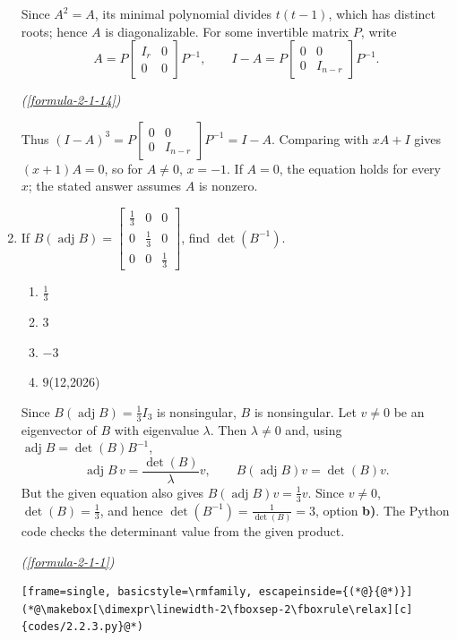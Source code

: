 \begin{enumerate}[label={},font=\normalfont,leftmargin=1.15cm,labelwidth=1.0cm,labelsep=0.15cm,itemindent=0pt,listparindent=0pt,itemsep=\baselineskip,parsep=0pt,topsep=0pt]
Since $A^2=A$, its minimal polynomial divides $t(t-1)$, which has distinct roots; hence $A$ is diagonalizable. For some invertible matrix $P$, write
\[
A=P\begin{bmatrix}I_r&0\\0&0\end{bmatrix}P^{-1},\qquad I-A=P\begin{bmatrix}0&0\\0&I_{n-r}\end{bmatrix}P^{-1}.
\]
\par\noindent\hfill\mbox{\textit{(\ref{formula-2-1-14})}}\par
Thus $(I-A)^3=P\begin{bmatrix}0&0\\0&I_{n-r}\end{bmatrix}P^{-1}=I-A$. Comparing with $xA+I$ gives $(x+1)A=0$, so for $A\ne0$, $\boxed{x=-1}$. If $A=0$, the equation holds for every $x$; the stated answer assumes $A$ is nonzero.

\item[2.2.3] If $B(\operatorname{adj}B)=\begin{bmatrix}\frac13&0&0\\0&\frac13&0\\0&0&\frac13\end{bmatrix}$, find $\det(B^{-1})$.

\begin{multicols}{4}
\begin{enumerate}
\setlength{\itemsep}{0pt}
    \item $\frac13$
    \item $3$
    \item $-3$
    \item $9$\nobreak\hfill\mbox{(12,2026)}
\end{enumerate}
\end{multicols}



\vspace{0.6em}\par\solution


Since $B(\operatorname{adj}B)=\frac13I_3$ is nonsingular, $B$ is nonsingular. Let $v\ne0$ be an eigenvector of $B$ with eigenvalue $\lambda$. Then $\lambda\ne0$ and, using $\operatorname{adj}B=\det(B)B^{-1}$,
\[
\operatorname{adj}B\,v=\frac{\det(B)}{\lambda}v,\qquad B(\operatorname{adj}B)v=\det(B)v.
\]
But the given equation also gives $B(\operatorname{adj}B)v=\frac13v$. Since $v\ne0$, $\det(B)=\frac13$, and hence $\det(B^{-1})=\frac1{\det(B)}=\boxed{3}$, option \textbf{b)}. The Python code checks the determinant value from the given product.
\par\noindent\hfill\mbox{\textit{(\ref{formula-2-1-1})}}\par\begin{lstlisting}[frame=single, basicstyle=\rmfamily, escapeinside={(*@}{@*)}]
(*@\makebox[\dimexpr\linewidth-2\fboxsep-2\fboxrule\relax][c]{codes/2.2.3.py}@*)
\end{lstlisting}


\end{enumerate}
